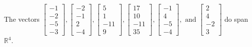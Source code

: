 \begin{exercise}
\begin{exerciseStatement}
  \end{exerciseStatement}
  \begin{exerciseAnswer}
   The vectors \(\left[\begin{array}{r}
-1 \\
-2 \\
-5 \\
-3
\end{array}\right] , \left[\begin{array}{r}
-2 \\
-1 \\
2 \\
-4
\end{array}\right] , \left[\begin{array}{r}
5 \\
1 \\
-11 \\
9
\end{array}\right] , \left[\begin{array}{r}
17 \\
10 \\
-11 \\
35
\end{array}\right] , \left[\begin{array}{r}
-1 \\
4 \\
-5 \\
-4
\end{array}\right] , \text{ and } \left[\begin{array}{r}
2 \\
4 \\
-2 \\
3
\end{array}\right]\) 
  	 do  
	span \(\mathbb{R}^4\).
  


  \end{exerciseAnswer}
\end{exercise}